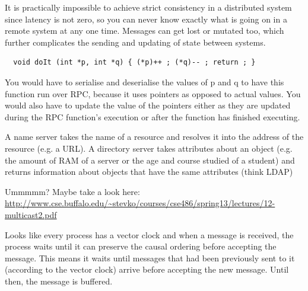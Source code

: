 
It is practically impossible to achieve strict consistency in a distributed
system since latency is not zero, so you can never know exactly what is going on
in a remote system at any one time. Messages can get lost or mutated too, which
further complicates the sending and updating of state between systems.


\begin{verbatim}
  void doIt (int *p, int *q) { (*p)++ ; (*q)-- ; return ; }
\end{verbatim}

You would have to serialise and deserialise the values of p and q to have this
function run over RPC, because it uses pointers as opposed to actual values. You
would also have to update the value of the pointers either as they are updated
during the RPC function’s execution or after the function has finished
executing.


A name server takes the name of a resource and resolves it into the address of
the resource (e.g. a URL). A directory server takes attributes about an object
(e.g. the amount of RAM of a server or the age and course studied of a student)
and returns information about objects that have the same attributes (think LDAP)


Ummmmm? Maybe take a look here:
\url{http://www.cse.buffalo.edu/~stevko/courses/cse486/spring13/lectures/12-multicast2.pdf}

Looks like every process has a vector clock and when a message is received, the
process waits until it can preserve the causal ordering before accepting the
message. This means it waits until messages that had been previously sent to it
(according to the vector clock) arrive before accepting the new message. Until
then, the message is buffered.


